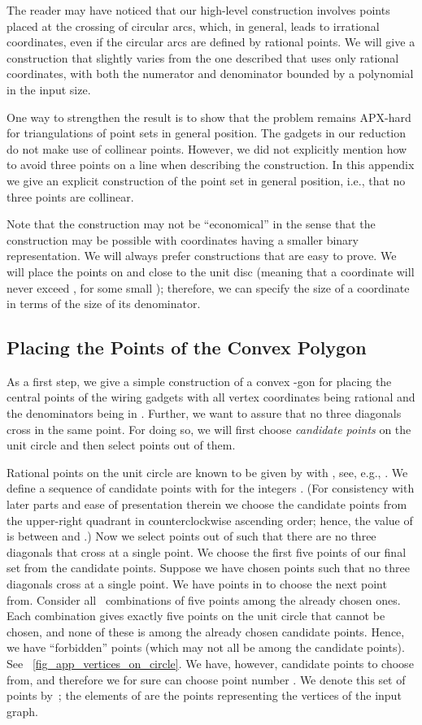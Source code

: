 \documentclass[11pt,a4paper]{article}
\begin{document}
The reader may have noticed that our high-level construction involves points placed at the crossing of circular arcs, which, in general, leads to irrational coordinates, even if the circular arcs are defined by rational points.
We will give a construction that slightly varies from the one described that uses only rational coordinates, with both the numerator and denominator bounded by a polynomial in the input size.

One way to strengthen the result is to show that the problem remains APX-hard for triangulations of point sets in general position.
The gadgets in our reduction do not make use of collinear points.
However, we did not explicitly mention how to avoid three points on a line when describing the construction.
In this appendix we give an explicit construction of the point set in general position, i.e., that no three points are collinear.


Note that the construction may not be ``economical'' in the sense that the construction may be possible with coordinates having a smaller binary representation.
We will always prefer constructions that are easy to prove.
We will place the points on and close to the unit disc (meaning that a coordinate will never exceed , for some small );
therefore, we can specify the size of a coordinate in terms of the size of its denominator.

\subsection{Placing the Points of the Convex Polygon}


As a first step, we give a simple construction of a convex -gon for placing the central points of the wiring gadgets with all vertex coordinates being rational and the denominators being in .
Further, we want to assure that no three diagonals cross in the same point.
For doing so, we will first choose  \emph{candidate points} on the unit circle and then select  points out of them.


Rational points on the unit circle are known to be given by  with , see, e.g., \cite{canny}.
We define a sequence  of candidate points with  for the integers .
(For consistency with later parts and ease of presentation therein we choose the candidate points from the upper-right quadrant in counterclockwise ascending order; hence, the value of  is between  and .)
Now we select  points out of  such that there are no three diagonals that cross at a single point.
We choose the first five points of our final set from the candidate points.
Suppose we have chosen  points such that no three diagonals cross at a single point.
We have  points in  to choose the next point from.
Consider all~ combinations of five points among the already chosen ones.
Each combination gives exactly five points on the unit circle that cannot be chosen, and none of these is among the  already chosen candidate points.
Hence, we have  ``forbidden'' points (which may not all be among the candidate points).
See \figurename~\ref{fig_app_vertices_on_circle}.
We have, however,  candidate points to choose from, and therefore we for sure can choose point number .
We denote this set of points by~; the elements of  are the points representing the vertices of the input graph.
\end{document}
